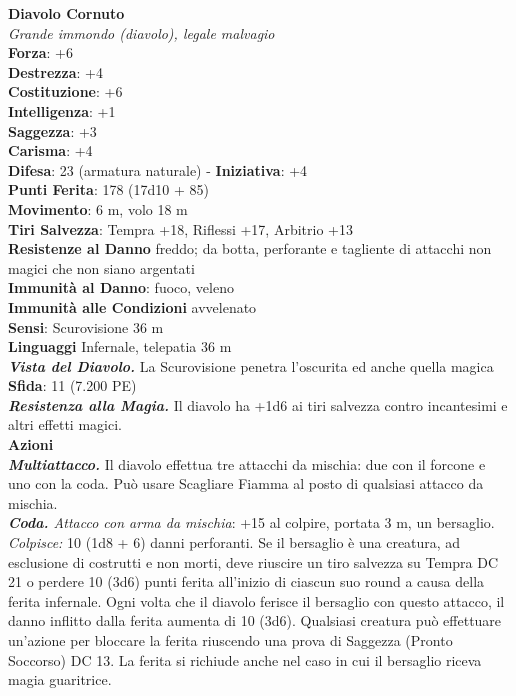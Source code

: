 \begin{multicols}{2}
\medskip\textbf{Diavolo Cornuto}\\
\emph{Grande immondo (diavolo), legale malvagio}\\
\textbf{Forza}: +6\\
\textbf{Destrezza}: +4\\
\textbf{Costituzione}: +6\\
\textbf{Intelligenza}: +1\\
\textbf{Saggezza}: +3\\
\textbf{Carisma}: +4\\
\textbf{Difesa}: 23 (armatura naturale) - \textbf{Iniziativa}: +4\\
\textbf{Punti Ferita}: 178 (17d10 + 85)\\
\textbf{Movimento}: 6 m, volo 18 m\\
\textbf{Tiri Salvezza}: Tempra +18, Riflessi +17, Arbitrio +13\\
\textbf{Resistenze al Danno} freddo; da botta, perforante e tagliente di attacchi non magici che non siano argentati\\
\textbf{Immunità al Danno}: fuoco, veleno\\
\textbf{Immunità alle Condizioni} avvelenato\\
\textbf{Sensi}: Scurovisione 36 m\\
\textbf{Linguaggi} Infernale, telepatia 36 m \\
\emph{\textbf{Vista del Diavolo.}} La Scurovisione penetra l'oscurita ed anche quella magica\\
\textbf{Sfida}: 11 (7.200 PE)\smallskip\\
\emph{\textbf{Resistenza alla Magia.}} Il diavolo ha +1d6 ai tiri salvezza contro incantesimi e altri effetti magici.\\
\smallskip\textbf{Azioni}\\
\emph{\textbf{Multiattacco.}} Il diavolo effettua tre attacchi da mischia: due con il forcone e uno con la coda. Può usare Scagliare Fiamma al posto di qualsiasi attacco da mischia.\\
\emph{\textbf{Coda.} Attacco con arma da mischia}: +15 al colpire, portata 3 m, un bersaglio.\\
\emph{Colpisce:} 10 (1d8 + 6) danni perforanti. Se il bersaglio è una creatura, ad esclusione di costrutti e non morti, deve riuscire un tiro salvezza su Tempra DC  21 o perdere 10 (3d6) punti ferita all'inizio di ciascun suo round a causa della ferita infernale. Ogni volta che il diavolo ferisce il bersaglio con questo attacco, il danno inflitto dalla ferita aumenta di 10 (3d6). Qualsiasi creatura può effettuare un'azione per bloccare la ferita riuscendo una prova di Saggezza (Pronto Soccorso) DC  13. La ferita si richiude anche nel caso in cui il bersaglio riceva magia guaritrice.\\

\end{multicols}
